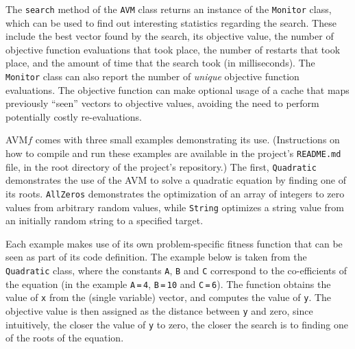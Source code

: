 \documentclass{llncs}
\newcommand{\AVM}{Alternating Variable Method\xspace}
\newcommand{\name}{AVM\hspace{-1pt}$f$\xspace}
\newcommand{\inlineheading}[1]{\vspace{1mm} \noindent {\bf #1.}}
\begin{document}
\begin{sloppypar}
\inlineheading{Reporting} The {\tt search} method of the {\tt AVM} class returns an instance of the {\tt Monitor} class, which can be used to find out interesting statistics regarding the search. These include the best vector found by the search, its objective value, the number of objective function evaluations that took place, the number of restarts that took place, and the amount of time that the search took (in milliseconds). The {\tt Monitor} class can also report the number of {\it unique} objective function evaluations. The objective function can make optional usage of a cache that maps previously ``seen'' vectors to objective values, avoiding the need to perform potentially costly re-evaluations.
\end{sloppypar}

\inlineheading{Examples} \name comes with three small examples demonstrating its use. (Instructions on how to compile and run these examples are available in the project's {\tt README.md} file, in the root directory of the project's repository.) The first, {\tt Quadratic} demonstrates the use of the AVM to solve a quadratic equation by finding one of its roots. {\tt AllZeros} demonstrates the optimization of an array of integers to zero values from arbitrary random values, while {\tt String} optimizes a string value from an initially random string to a specified target.

Each example makes use of its own problem-specific fitness function that can be seen as part of its code definition. The example below is taken from the {\tt Quadratic} class, where the constants {\tt A}, {\tt B} and {\tt C} correspond to the co-efficients of the equation (in the example {\tt A}\,{\tt =}\,{\tt 4}, {\tt B}\,{\tt =}\,{\tt 10} and {\tt C}\,{\tt =}\,{\tt 6}). The function obtains the value of {\tt x} from the (single variable) vector, and computes the value of {\tt y}. The objective value is then assigned as the distance between {\tt y} and zero, since intuitively, the closer the value of {\tt y} to zero, the closer the search is to finding one of the roots of the equation.
\end{document}
